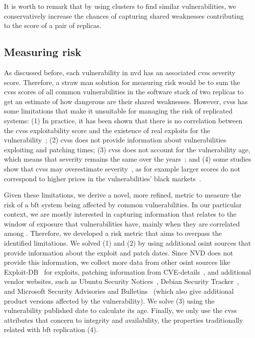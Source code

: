 It is worth to remark that by using clusters to find similar vulnerabilities, we conservatively increase the chances of capturing shared weaknesses contributing to the score of a pair of replicas.

\subsection{Measuring risk}
\label{sec:measurerisk}

As discussed before, each vulnerability in \gls{nvd} has an associated \gls{cvss} severity score. 
Therefore, a straw man solution for measuring risk would be to sum the \gls{cvss} scores of all common vulnerabilities in the software stack of two replicas to get an estimate of how dangerous are their shared weaknesses.
However, \gls{cvss} has some limitations that make it unsuitable for managing the risk of replicated systems:
(1) In practice, it has been shown that there is no correlation between the \gls{cvss} exploitability score and the existence of real exploits for the vulnerability~\cite{Bozorgi:2010}; 
(2) \gls{cvss} does not provide information about vulnerabilities exploiting and patching times; 
(3) \gls{cvss} does not account for the vulnerability age, which means that severity remains the same over the years~\cite{Frei:2006,Melo:2013}; 
and (4) some studies show that \gls{cvss} may overestimate  severity~\cite{Sabottke:2015}, as for example larger scores do not correspond to higher prices in the vulnerabilities' black markets~\cite{Allodi:2014}.

Given these limitations, we derive a novel, more refined, metric to measure the risk of a \gls{bft} system being affected by common vulnerabilities.
In our particular context, we are mostly interested in capturing information that relates to the window of exposure that vulnerabilities have, mainly when they are correlated among \replicas.
Therefore, we developed a risk metric that aims to overpass the identified limitations. 
We solved (1) and (2) by using additional \gls{osint} sources that provide information about the exploit and patch dates. 
Since NVD does not provide this information, we collect more data from other \gls{osint} sources like Exploit-DB~\cite{edb} for exploits, patching information from CVE-details~\cite{cvedetails}, and additional vendor websites, such as Ubuntu Security Notices~\cite{ubuntu}, Debian Security Tracker~\cite{debian}, and Microsoft Security Advisories and Bulletins~\cite{microsoft} (which also give additional product versions affected by the vulnerability).
We solve (3) using the vulnerability published date to calculate its age.
Finally, we only use the \gls{cvss} attributes that concern to integrity and availability, the properties traditionally related with \gls{bft} replication (4).


